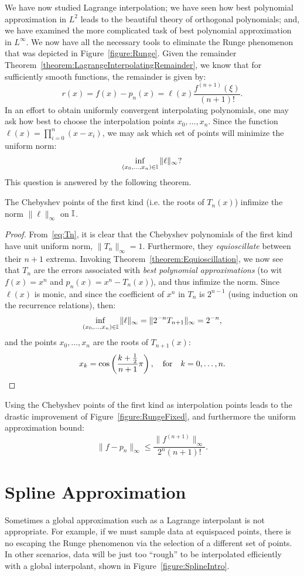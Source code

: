 We have now studied Lagrange interpolation; we have seen how best polynomial approximation in $L^2$ leads to the beautiful theory of orthogonal polynomials; and, we have examined the more complicated task of best polynomial approximation in $L^\infty$. We now have all the necessary tools to eliminate the Runge phenomenon that was depicted in Figure~\ref{figure:Runge}. Given the remainder Theorem~\ref{theorem:LagrangeInterpolatingRemainder}, we know that for sufficiently smooth functions, the remainder is given by:
\[
r(x) = f(x)-p_n(x) = \ell(x)\dfrac{f^{(n+1)}(\xi)}{(n+1)!}.
\]
In an effort to obtain uniformly convergent interpolating polynomials, one may ask how best to choose the interpolation points $x_0,\ldots,x_n$. Since the function $\ell(x) = \prod_{i=0}^n(x-x_i)$, we may ask which set of points will minimize the uniform norm:
\[
\inf_{(x_0,\ldots,x_n)\in\mathbb{I}}\|\ell\|_\infty?
\]
This question is answered by the following theorem.
\begin{theorem}
The Chebyshev points of the first kind (i.e. the roots of $T_n(x)$) infimize the norm $\|\ell\|_\infty$ on $\mathbb{I}$.
\end{theorem}
\begin{proof}
From~\eqref{eq:Tn}, it is clear that the Chebyshev polynomials of the first kind have unit uniform norm, $\|T_n\|_\infty = 1$. Furthermore, they {\em equioscillate} between their $n+1$ extrema. Invoking Theorem~\ref{theorem:Equioscillation}, we now see that $T_n$ are the errors associated with {\em best polynomial approximations} (to wit $f(x) = x^n$ and $p_n(x) = x^n-T_n(x)$), and thus infimize the norm. Since $\ell(x)$ is monic, and since the coefficient of $x^n$ in $T_n$ is $2^{n-1}$ (using induction on the recurrence relations), then:
\[
\inf_{(x_0,\ldots,x_n)\in\mathbb{I}}\|\ell\|_\infty = \|2^{-n}T_{n+1}\|_\infty = 2^{-n},
\]
and the points $x_0,\ldots,x_n$ are the roots of $T_{n+1}(x)$:
\[
x_k = \cos\left(\dfrac{k+\frac{1}{2}}{n+1}\pi\right),\quad{\rm for}\quad k=0,\ldots,n.
\]
\end{proof}
Using the Chebyshev points of the first kind as interpolation points leads to the drastic improvement of Figure~\ref{figure:RungeFixed}, and furthermore the uniform approximation bound:
\[
\|f-p_n\|_\infty \le \dfrac{\|f^{(n+1)}\|_\infty}{2^{n}(n+1)!}.
\]

\section{Spline Approximation}

Sometimes a global approximation such as a Lagrange interpolant is not appropriate. For example, if we must sample data at equispaced points, there is no escaping the Runge phenomenon via the selection of a different set of points. In other scenarios, data will be just too ``rough'' to be interpolated efficiently with a global interpolant, shown in Figure~\ref{figure:SplineIntro}.


